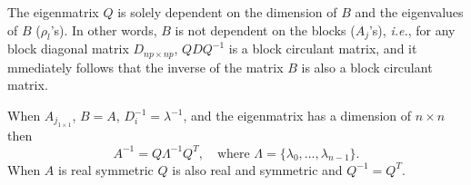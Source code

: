 The eigenmatrix $Q$ is solely dependent on the dimension of $B$ and the eigenvalues of $B$ ($\rho_l$'s). In other words, $B$ is not dependent on the blocks ($A_j$'s), {\em i.e.}, for any block diagonal matrix $D_{np \times np}$, $QDQ^{-1}$ is a block circulant matrix, and it mmediately follows that the inverse of the matrix $B$ is also a block circulant matrix.

\noi When $A_{j_{1\times 1}}$, $B=A$, $D_i^{-1}=\lambda^{-1}$, and the eigenmatrix has a dimension of $n\times n$ then
\[
A^{-1} = Q \Lambda^{-1} Q^T, \quad \mbox{where $\Lambda = \{\lambda_0, \ldots, \lambda_{n-1} \}$}.
\]
When $A$ is real symmetric $Q$ is also real and symmetric and $Q^{-1}=Q^T$.





%
%
%
%			
%			
%			
%			
%			
%			
%			
%			
%			
%			
%			
%			
%
